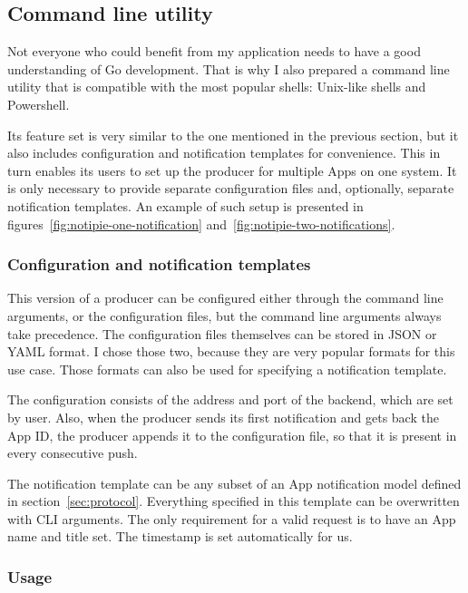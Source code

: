 \subsection{Command line utility}\label{sec:command-line-utility}

Not everyone who could benefit
from my application
needs to have a good understanding
of Go development.
That is why I also prepared
a command line utility
that is compatible with the most popular shells:
Unix-like shells and Powershell.

Its feature set is very similar
to the one mentioned in the previous section,
but it also includes configuration
and notification templates
for convenience.
This in turn enables its users
to set up the producer for multiple Apps
on one system.
It is only necessary to provide
separate configuration files
and, optionally, separate notification templates.
An example of such setup is presented
in figures~\ref{fig:notipie-one-notification}
and~\ref{fig:notipie-two-notifications}.

\subsubsection{Configuration and notification templates}\label{sec:configuration-and-notification-templates}

This version of a producer can be configured
either through the command line arguments,
or the configuration files,
but the command line arguments
always take precedence.
The configuration files themselves
can be stored in JSON or YAML format.
I chose those two,
because they are very popular formats
for this use case.
Those formats can also be used
for specifying a notification template.

The configuration consists of
the address and port of the backend,
which are set by user.
Also, when the producer sends its first notification
and gets back the App ID,
the producer appends it to the configuration file,
so that it is present in every consecutive push.

The notification template can be any
subset of an App notification model
defined in section~\ref{sec:protocol}.
Everything specified in this template
can be overwritten with CLI arguments.
The only requirement for a valid request
is to have an App name and title set.
The timestamp is set automatically for us.

\subsubsection{Usage}\label{sec:producer-usage}

